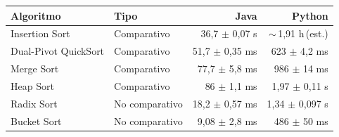 {\small
\begin{tabular}{llrr}
\toprule
Algoritmo & Tipo & Java & Python \\
\midrule
Insertion Sort & Comparativo & 36,7 $\pm$ 0,07 s & $\sim$\,1,91 h\,(est.) \\
Dual-Pivot QuickSort & Comparativo & 51,7 $\pm$ 0,35 ms & 623 $\pm$ 4,2 ms \\
Merge Sort & Comparativo & 77,7 $\pm$ 5,8 ms & 986 $\pm$ 14 ms \\
Heap Sort & Comparativo & 86 $\pm$ 1,1 ms & 1,97 $\pm$ 0,11 s \\
Radix Sort & No comparativo & 18,2 $\pm$ 0,57 ms & 1,34 $\pm$ 0,097 s \\
Bucket Sort & No comparativo & 9,08 $\pm$ 2,8 ms & 486 $\pm$ 50 ms \\
\bottomrule
\end{tabular}}\par
